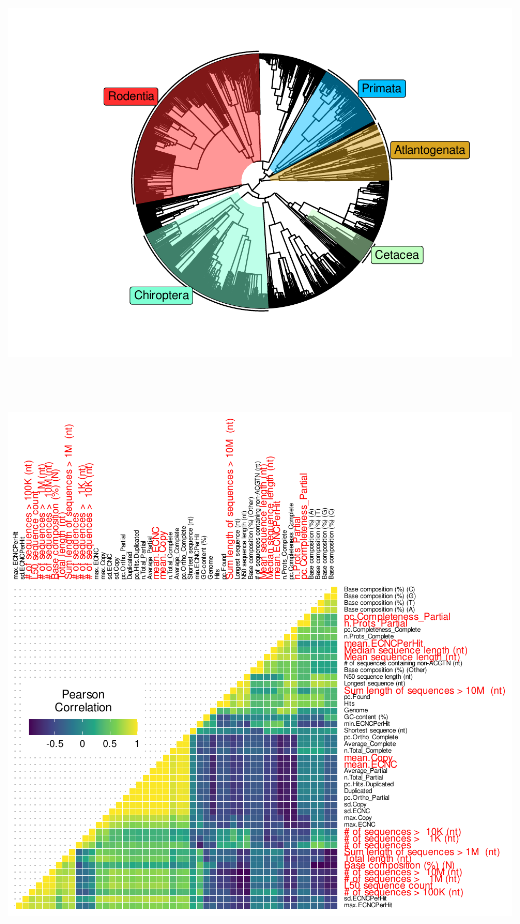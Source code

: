 \documentclass[]{elsarticle} %
\let\origfigure\figure
\let\endorigfigure\endfigure
\renewenvironment{figure}[1][2] {
    \expandafter\origfigure\expandafter[H]
} {
    \endorigfigure
}
\begin{document}
\begin{figure}[H]
\includegraphics[width=6in,]{paper_PLOS_draft_files/figure-latex/SFigure-TimeTree-Eutheria-1} \caption{The time-calibrated Eutherian tree used as input for StableTraits, from Bininda-Emonds \emph{et al.} (\emph{117}) and Puttick and Thomas (\emph{25}).}\label{fig:SFigure-TimeTree-Eutheria}
\end{figure}





\begin{figure}[H]

{\centering \includegraphics[width=6in,height=6in,]{paper_PLOS_draft_files/figure-latex/SFigure-GenomeCor-1} 

}

\caption{Correlations between genome quality metrics and ECNC metrics. Gene copy number metrics, and the genome quality metrics most strongly associated with them, are highlighted in red.}\label{fig:SFigure-GenomeCor}
\end{figure}
\end{document}
